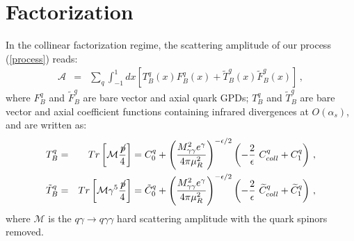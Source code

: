 \documentclass[aps,prd,superscriptaddress,floatfix,showpacs]{revtex4}
\begin{document}
\section{Factorization}
In the collinear factorization regime, %
the scattering amplitude of our process (\ref{process}) reads:
\begin{eqnarray}
\mathcal{A} &=& \sum_q\int_{-1}^1 dx \left[
 T_B^q(x) F_B^q(x)  
+ \widetilde{T}_B^q(x) \widetilde{F}_B^q(x)
 \right]
 \,,
\label{eq:factorizedamplitude}
\end{eqnarray}
where $F_B^q$ and $\widetilde{F}_B^q$ are bare vector and axial quark GPDs; $T_B^q$ and $\widetilde{T}_B^q$ are bare vector and axial coefficient functions containing infrared divergences at $O(\alpha_s)$, and are written as:
\begin{eqnarray}
T_B^q &=&Tr\left[\mathcal{M}\frac{\not\!{p}}{4}\right]=
C_0^q + 
\left(
\frac{M^2_{\gamma\gamma}e^\gamma}{4\pi\mu_R^2}
\right)^{-\epsilon/2}
\left(
-\frac{2}{\epsilon}~C_{coll}^{q} + C_1^{q}
\right) \label{eq-def-Ccoll} \,,\\
\tilde{T}_B^q &=&Tr\left[\mathcal{M}\gamma^5\frac{\not\!{p}}{4}\right]=
\tilde{C}_0^q + 
\left(
\frac{M^2_{\gamma\gamma}e^\gamma}{4\pi\mu_R^2}
\right)^{-\epsilon/2}
\left(
-\frac{2}{\epsilon}~\widetilde{C}_{coll}^{q} + \widetilde{C}_1^{q}
\right)\,,
\label{eq:coeff}
\end{eqnarray}
where $\mathcal{M}$ is the $q\gamma \to q \gamma\gamma$ hard scattering amplitude with the quark spinors removed.
\end{document}
